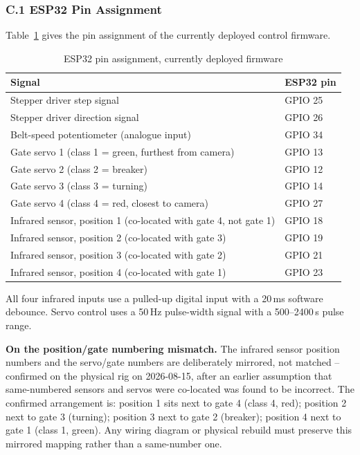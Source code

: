 \subsubsection*{C.1 ESP32 Pin Assignment}

Table~\ref{tab:appendixC_pins} gives the pin assignment of the currently deployed control firmware.

\begin{table}[H]
\caption{ESP32 pin assignment, currently deployed firmware}
\label{tab:appendixC_pins}
\centering
\begin{tabularx}{\textwidth}{>{\raggedright\arraybackslash}p{8cm} >{\raggedright\arraybackslash}X}
\toprule
\textbf{Signal} & \textbf{ESP32 pin} \\
\midrule
Stepper driver step signal & GPIO 25 \\
Stepper driver direction signal & GPIO 26 \\
Belt-speed potentiometer (analogue input) & GPIO 34 \\
Gate servo 1 (class 1 = green, furthest from camera) & GPIO 13 \\
Gate servo 2 (class 2 = breaker) & GPIO 12 \\
Gate servo 3 (class 3 = turning) & GPIO 14 \\
Gate servo 4 (class 4 = red, closest to camera) & GPIO 27 \\
Infrared sensor, position 1 (co-located with gate 4, not gate 1) & GPIO 18 \\
Infrared sensor, position 2 (co-located with gate 3) & GPIO 19 \\
Infrared sensor, position 3 (co-located with gate 2) & GPIO 21 \\
Infrared sensor, position 4 (co-located with gate 1) & GPIO 23 \\
\bottomrule
\end{tabularx}

\vspace{2mm}
{\footnotesize All four infrared inputs use a pulled-up digital input with a 20\,ms software debounce. Servo control uses a 50\,Hz pulse-width signal with a 500--2400\,\textmu s pulse range.}
\end{table}

\textbf{On the position/gate numbering mismatch.} The infrared sensor position numbers and the servo/gate numbers are deliberately mirrored, not matched -- confirmed on the physical rig on 2026-08-15, after an earlier assumption that same-numbered sensors and servos were co-located was found to be incorrect. The confirmed arrangement is: position 1 sits next to gate 4 (class 4, red); position 2 next to gate 3 (turning); position 3 next to gate 2 (breaker); position 4 next to gate 1 (class 1, green). Any wiring diagram or physical rebuild must preserve this mirrored mapping rather than a same-number one.

